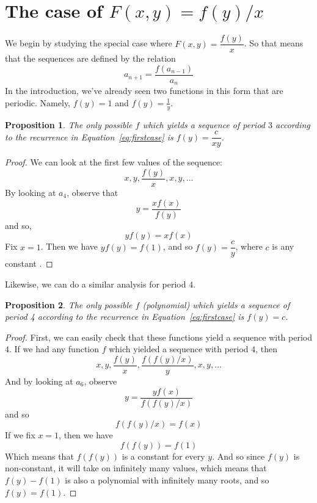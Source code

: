 \documentclass[12pt]{article}
\newtheorem{proposition}{Proposition}
\begin{document}
\section{The case of $F(x,y) = f(y)/x$}

We begin by studying the special case where $F(x,y) = \dfrac{f(y)}{x}$. So that means that the sequences are defined by the relation
\begin{equation}
\label{eq:firstcase}
a_{n+1} = \dfrac{f(a_{n-1})}{a_n}
\end{equation}
In the introduction, we've already seen two functions in this form that are periodic. Namely, $f(y) = 1$ and $f(y) = \frac{1}{y}$. 

\begin{proposition}
The only possible $f$ which yields a sequence of period $3$ according to the recurrence in Equation~\ref{eq:firstcase} is $f(y) = \dfrac{c}{xy}$.
\end{proposition}

\begin{proof}
We can look at the first few values of the sequence:
\[ x, y, \dfrac{f(y)}{x}, x, y, \dots \]
By looking at $a_4$, observe that
\[ y = \dfrac{xf(x)}{f(y)} \]
and so,
\[ y f(y) = x f(x) \]
Fix $x = 1$. Then we have $y f(y) = f(1)$, and so $f(y) = \dfrac{c}{y}$, where $c$ is any constant .
\end{proof}

Likewise, we can do a similar analysis for period $4$. 
\begin{proposition}
The only possible $f$ (polynomial) which yields a sequence of period 4 according to the recurrence in Equation~\ref{eq:firstcase} is $f(y) = c$. 
\end{proposition}

\begin{proof}
First, we can easily check that these functions yield a sequence with period $4$. If we had any function $f$ which yielded a sequence with period $4$, then 
\[ x, y, \dfrac{f(y)}{x}, \dfrac{f(f(y)/x)}{y}, x, y, \dots \]
And by looking at $a_6$, observe
\[ y = \dfrac{yf(x)}{f(f(y)/x)} \]
and so 
\[ f(f(y)/x) = f(x) \]
If we fix $x = 1$, then we have
\[ f(f(y)) = f(1) \]
Which means that $f(f(y))$ is a constant for every $y$. And so since $f(y)$ is non-constant, it will take on infinitely many values, which means that $f(y) - f(1)$ is also a polynomial with infinitely many roots, and so $f(y) = f(1)$. 
\end{proof}
\end{document}

